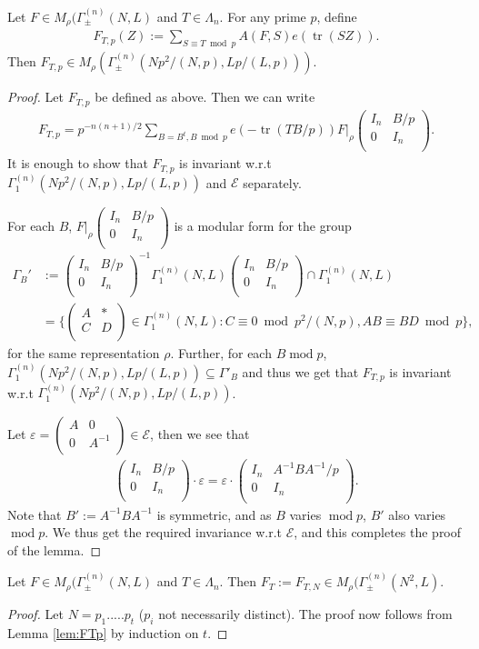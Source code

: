 \documentclass[11pt]{amsart}
\numberwithin{equation}{section}
\newcommand{\mc}{\mathcal}
\newcommand{\smat}[4]{\left( \begin{smallmatrix} #1 & #2 \\ #3 & #4 \\ \end{smallmatrix} \right)}
\DeclareMathOperator{\tr}{tr}
\renewcommand*{\mod}{\operatorname{mod}}
\newcommand{\Mrho}[2]{M_\rho(\Gamma_\pm^{(#1)}(#2, L)}
\begin{document}
\begin{lemma}\label{lem:FTp}
    Let $F \in \Mrho{n}{N}$ and $T\in \Lambda_n$. For any prime $p$, define 
    \begin{align}
        F_{T,p}(Z):= \sum_{S\equiv T \bmod p} A(F,S) e(\tr(SZ)).
    \end{align}
Then $F_{T,p}\in M_\rho(\Gamma_\pm^{(n)}(Np^2/(N,p), Lp/(L,p)))$.
\end{lemma}
\begin{proof}
    Let $F_{T,p}$ be defined as above. Then we can write
    \begin{align}
        F_{T,p}= p^{-n(n+1)/2} \sum_{B=B^t, B \bmod p} e(-\tr(TB/p))F|_\rho\smat{I_n}{B/p}{0}{I_n}.
    \end{align}
It is enough to show that $F_{T,p}$ is invariant w.r.t $\Gamma_1^{(n)}(Np^2/(N,p), Lp/(L,p))$ and $\mc E$ separately.

For each $B$, $F|_\rho\smat{I_n}{B/p}{0}{I_n}$ is a modular form for the group 
\begin{align}
\Gamma_B'&:=\smat{I_n}{B/p}{0}{I_n}^{-1}\Gamma_1^{(n)}(N, L)\smat{I_n}{B/p}{0}{I_n}\cap \Gamma_1^{(n)}(N,L)\\
&=\{\smat{A}{*}{C}{D}\in \Gamma_1^{(n)}(N,L): C\equiv 0\bmod p^2/(N,p), AB\equiv BD\bmod p\},
\end{align}
for the same representation $\rho$.
Further, for each $B\mod p$, $\Gamma_1^{(n)}(Np^2/(N,p), Lp/(L,p))\subseteq \Gamma'_B$ and thus we get that $F_{T,p}$ is invariant w.r.t $\Gamma_1^{(n)}(Np^2/(N,p), Lp/(L,p))$.

Let $\varepsilon=\smat{A}{0}{0}{A^{-1}}\in\mc E$, then we see that
\begin{align}
    \smat{I_n}{B/p}{0}{I_n}\cdot \varepsilon= \varepsilon\cdot \smat{I_n}{A^{-1}BA^{-1}/p}{0}{I_n}.
\end{align}
Note that $B':=A^{-1}BA^{-1}$ is symmetric, and as $B$ varies $\mod p$, $B'$ also varies $\mod p$. We thus get the required invariance w.r.t $\mc E$, and this completes the proof of the lemma.
\end{proof}
\begin{lemma}\label{lem:FTN}
     Let $F \in \Mrho{n}{N}$ and $T\in \Lambda_n$. Then $F_T:=F_{T, N}\in \Mrho{n}{N^2}$.
\end{lemma}
\begin{proof}
    Let $N=p_1.....p_t$ ($p_i$ not necessarily distinct). The proof now follows from Lemma \ref{lem:FTp} by induction on $t$.
\end{proof}
\end{document}
